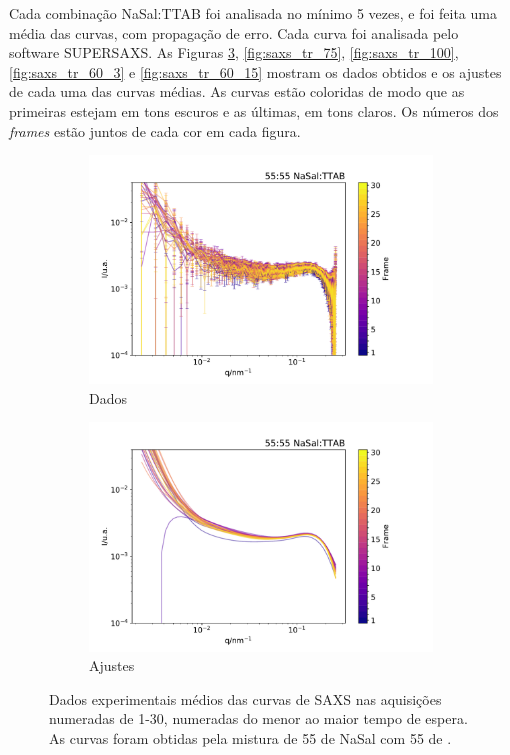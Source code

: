	Cada combinação NaSal:TTAB foi analisada no mínimo 5 vezes, e foi feita uma média das curvas, com propagação de erro. Cada curva foi analisada pelo software SUPERSAXS. As Figuras \ref{fig:saxs_tr_55}, \ref{fig:saxs_tr_75}, \ref{fig:saxs_tr_100}, \ref{fig:saxs_tr_60_3} e \ref{fig:saxs_tr_60_15} mostram os dados obtidos e os ajustes de cada uma das curvas médias. As curvas estão coloridas de modo que as primeiras estejam em tons escuros e as últimas, em tons claros. Os números dos \emph{frames} estão juntos de cada cor em cada figura.
	
	\begin{figure}[h]
		\begin{subfigure}[t]{0.5\textwidth}
			\centering
			\includegraphics[width=\textwidth]{imagens/saxs/TR_saxs_55_55_dados.pdf}
			\caption{Dados}
			\label{fig:saxs_tr_55_d}
		\end{subfigure}%
		\begin{subfigure}[t]{0.5\textwidth}
			\centering
			\includegraphics[width=\textwidth]{imagens/saxs/TR_saxs_55_55_ajuste.pdf}
			\caption{Ajustes}
			\label{fig:saxs_tr_55_a}
		\end{subfigure}
		\caption{Dados experimentais médios das curvas de SAXS nas aquisições numeradas de 1-30, numeradas do menor ao maior tempo de espera. As curvas foram obtidas pela mistura de 55 \mM{} de NaSal com 55\mM{} de \TTAB.}
		\label{fig:saxs_tr_55}
	\end{figure} 

